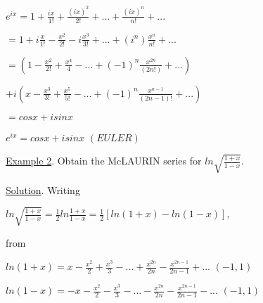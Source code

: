 \documentclass[11pt,a4paper]{article}
\begin{document}
\hspace{0.5cm} $e^{ix}= 1 + \frac{ix}{1!} + \frac{(ix)^2}{2!}+ ... + \frac{(ix)^{n}}{n!} + ... $ \vspace{0.25cm}

\hspace{1cm} $= 1 + i\frac{x}{1!} - \frac{x^2}{2!} - i\frac{x^3}{3!} + ... + (i^n)\frac{x^n}{n!} + ...$ \vspace{0.25cm}

\hspace{1cm} $= (1 - \frac{x^2}{2!} + \frac{x^4}{4} - ... + (-1)^n \frac{x^{2n}}{(2n!)} + ... )$ \vspace{0.25cm}

\hspace{1cm} $+  i (x - \frac{x^3}{3!} + \frac{x^5}{5!} - ... + (-1)^n \frac{x^{n-1}}{(2n-1)!} + ...)$ \vspace{0.25cm}

\hspace{1cm} $= cosx + i sinx$ \vspace{0.25cm}

\hspace{1.4cm} $e^{ix} = cosx + i sinx$ \hspace{1.5cm}  $(EULER)$ \vspace{0.25cm}

\hspace{0.5cm} \underline{Example 2}. \hspace{0.25cm} Obtain the McLAURIN series for $ln \sqrt{\frac{1+x}{1-x}}$. \vspace{0.30cm}

\hspace{0.5cm} \underline{Solution}. \hspace{0.25cm}  Writing \vspace{0.25cm}

\hspace{0.75cm} $ln \sqrt{\frac{1+x}{1-x}} = \frac{1}{2} ln \frac{1+x}{1-x} = \frac{1}{2} [ln(1+x) - ln(1-x)]$, 

from  \vspace{0.25cm}

\hspace{0.75cm} $ln(1+x) = x - \frac{x^2}{2} + \frac{x^3}{3} - ... + \frac{x^{2n}}{2n} - \frac{x^{2n-1}}{2n-1} + ... $ \hspace{1cm} $(-1,1)$ \vspace{0.25cm}

\hspace{0.75cm} $ln(1-x) = -x - \frac{x^2}{2} - \frac{x^3}{3} - ... - \frac{x^{2n}}{2n} - \frac{x^{2n-1}}{2n-1} - ...  $  \hspace{0.7cm} $(-1,1)$ \vspace{0.25cm}
\end{document}
